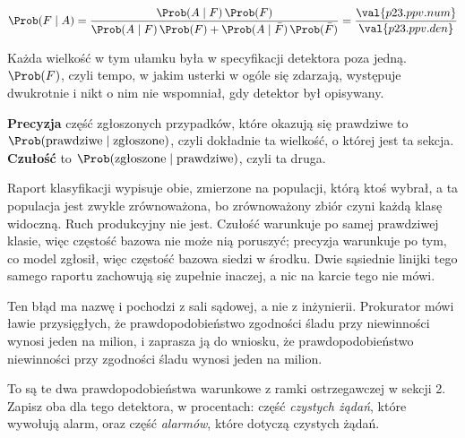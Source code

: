 \begin{fr}
\begin{ansblock}
\[ \Prob(F \mid A)
   = \frac{\Prob(A \mid F)\,\Prob(F)}
          {\Prob(A \mid F)\,\Prob(F) + \Prob(A \mid \bar{F})\,\Prob(\bar{F})}
   = \frac{\val{p23.ppv.num}}{\val{p23.ppv.den}} \]
\end{ansblock}

Każda wielkość w tym ułamku była w specyfikacji detektora poza jedną.
$\Prob(F)$, czyli tempo, w jakim usterki w ogóle się zdarzają, występuje
dwukrotnie i nikt o nim nie wspomniał, gdy detektor był opisywany.

\begin{aibox}
\textbf{Precyzja} \dash{} część zgłoszonych przypadków, które okazują się
prawdziwe \dash{} to $\Prob(\text{prawdziwe} \mid \text{zgłoszone})$, czyli
dokładnie ta wielkość, o której jest ta sekcja. \textbf{Czułość} to
$\Prob(\text{zgłoszone} \mid \text{prawdziwe})$, czyli ta druga.

Raport klasyfikacji wypisuje obie, zmierzone na populacji, którą ktoś wybrał, a
ta populacja jest zwykle zrównoważona, bo zrównoważony zbiór czyni każdą klasę
widoczną. Ruch produkcyjny nie jest. Czułość warunkuje po samej prawdziwej
klasie, więc częstość bazowa nie może nią poruszyć; precyzja warunkuje po tym,
co model zgłosił, więc częstość bazowa siedzi w środku. Dwie sąsiednie
linijki tego samego raportu zachowują się zupełnie inaczej, a nic na karcie
tego nie mówi.
\end{aibox}

\end{fr}

\begin{fr}
Ten błąd ma nazwę i pochodzi z sali sądowej, a nie z inżynierii. Prokurator
mówi ławie przysięgłych, że prawdopodobieństwo zgodności śladu przy
niewinności wynosi jeden na milion, i zaprasza ją do wniosku, że
prawdopodobieństwo niewinności przy zgodności śladu wynosi jeden na milion.

To są te dwa prawdopodobieństwa warunkowe z ramki ostrzegawczej w sekcji 2.
Zapisz oba dla tego detektora, w procentach: część \emph{czystych żądań},
które wywołują alarm, oraz część \emph{alarmów}, które dotyczą czystych żądań.
\dotline
\nextframe
\end{fr}

